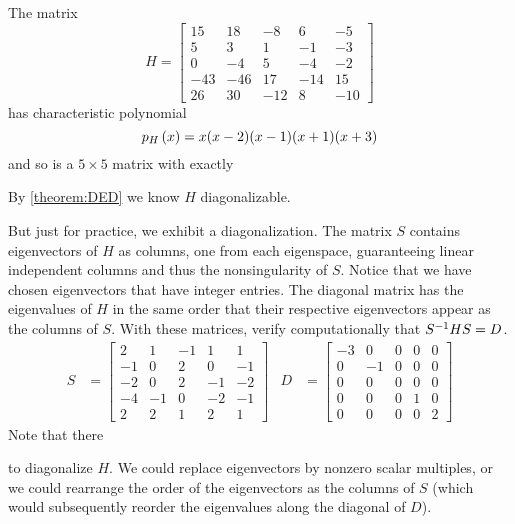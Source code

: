 \documentclass{ximera}
\begin{document}
\begin{example}

The matrix
\[
H=
\begin{bmatrix}
15 & 18 & -8 & 6 & -5\\
5 & 3 & 1 & -1 & -3\\
0 & -4 & 5 & -4 & -2\\
-43 & -46 & 17 & -14 & 15\\
26 & 30 & -12 & 8 & -10
\end{bmatrix}
\]
has characteristic polynomial
\[
p_{H}\left(x\right)=x(x-2)(x-1)(x+1)(x+3)
\]
and so is a $5\times 5$ matrix with exactly
\begin{multipleChoice}
\end{multipleChoice}

By \ref{theorem:DED} we know $H$  diagonalizable.

But just for practice, we exhibit a diagonalization.  The matrix $S$
contains eigenvectors of $H$ as columns, one from each eigenspace,
guaranteeing linear independent columns and thus the nonsingularity of
$S$.  Notice that we have chosen eigenvectors that have integer
entries.  The diagonal matrix has the eigenvalues of $H$ in the same
order that their respective eigenvectors appear as the columns of $S$.
With these matrices, verify computationally that $S^{-1}HS=D$.
\begin{align*}
S&=
\begin{bmatrix}
2 & 1 & -1 & 1 & 1\\
-1 & 0 & 2 & 0 & -1\\
-2 & 0 & 2 & -1 & -2\\
-4 & -1 & 0 & -2 & -1\\
2 & 2 & 1 & 2 & 1
\end{bmatrix}
&D&=
\begin{bmatrix}
-3 & 0 & 0 & 0 & 0\\
0 & -1 & 0 & 0 & 0\\
0 & 0 & 0 & 0 & 0\\
0 & 0 & 0 & 1 & 0\\
0 & 0 & 0 & 0 & 2
\end{bmatrix}
\end{align*}
Note that there 
\begin{multipleChoice}
\end{multipleChoice}
to diagonalize $H$.  We could replace eigenvectors by nonzero scalar
multiples, or we could rearrange the order of the eigenvectors as the
columns of $S$ (which would subsequently reorder the eigenvalues along
the diagonal of $D$).
\end{example}
\end{document}
